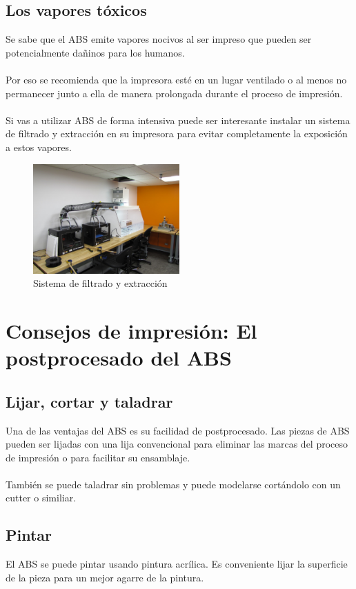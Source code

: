 \documentclass[11pt,a4paper]{article}
\begin{document}
	\subsection{Los vapores tóxicos}Se sabe que el ABS emite vapores nocivos al ser impreso que pueden ser potencialmente dañinos para los humanos.
\\\\
Por eso se recomienda que la impresora esté en un lugar ventilado o al menos no permanecer junto a ella de manera prolongada durante el proceso de impresión.
\\\\
Si vas a utilizar ABS de forma intensiva puede ser interesante instalar un sistema de filtrado y extracción en su impresora para evitar completamente la exposición a estos vapores.
\begin{figure}[H]
\centering
\includegraphics[width=0.5\textwidth,cfbox=azul_marcos 4pt 0pt]{FOTOS/VENTILACIONVAPORES}
\caption*{Sistema de filtrado y extracción}
\end{figure}
\section{Consejos de impresión: El postprocesado del ABS}
	\subsection{Lijar, cortar y taladrar}Una de las ventajas del ABS es su facilidad de postprocesado. Las piezas de ABS pueden ser lijadas con una lija convencional para eliminar las marcas del proceso de impresión o para facilitar su ensamblaje.
\\\\
También se puede taladrar sin problemas y puede modelarse cortándolo con un cutter o similiar.
	\subsection{Pintar}El ABS se puede pintar usando pintura acrílica. Es conveniente lijar la superficie de la pieza para un mejor agarre de la pintura.
\end{document}
